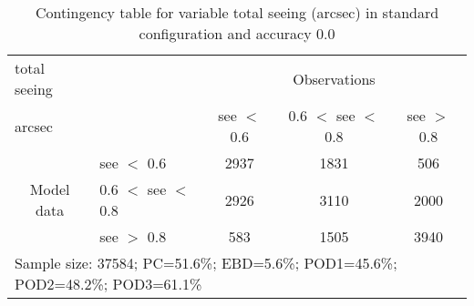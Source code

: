 \begin{table}[]
\begin{center}
\begin{tabular}{llccc}
\hline
{total seeing}                                       &                                                    & \multicolumn{3}{c}{Observations}                 \\
{arcsec}                                       &                             & see $<$ 0.6   & 0.6 $<$ see $<$ 0.8 & see $>$ 0.8 \\
\hline
\multicolumn{1}{c}{\multirow{3}{*}{Model data}}  & see $<$ 0.6             & 2937                & 1831                       & 506              \\
                                                 & 0.6  $<$ see $<$ 0.8 & 2926                & 3110                       & 2000              \\
                                                 & see $>$ 0.8             & 583                & 1505                       & 3940              \\
\hline
\multicolumn{5}{l}{Sample size: 37584; PC=51.6\%; EBD=5.6\%; POD1=45.6\%; POD2=48.2\%; POD3=61.1\%}
\end{tabular}
\end{center}
\caption{Contingency table for variable total seeing (arcsec) in standard configuration and accuracy 0.0}
\label{tab:contingencyseeBEF}
\end{table}
